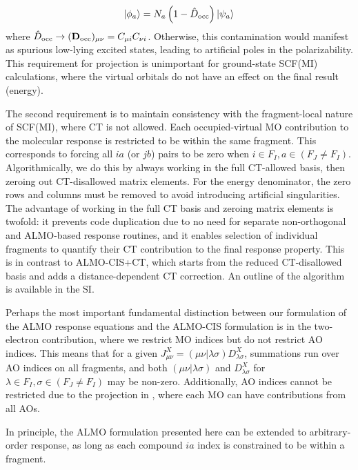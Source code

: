 \documentclass[%
  class = book,%
  crop = false,%
  float = true,%
  multi = true,%
  preview = false,%
]{standalone}
\let\cite\autocite
\begin{document}
\begin{equation}
  \label{eq:projected-virtuals}
  \ket{\phi_{a}} = N_{a} \left( 1 - \hat{D}_{\text{occ}} \right) \ket{\psi_{a}}
\end{equation}
where \(\hat{D}_{\text{occ}} \rightarrow (\mathbf{D}_{\text{occ}})_{\mu\nu} = C_{\mu i} C_{\nu i}\). Otherwise, this contamination would manifest as spurious low-lying excited states, leading to artificial poles in the polarizability. This requirement for projection is unimportant for ground-state SCF(MI) calculations, where the virtual orbitals do not have an effect on the final result (energy).

The second requirement is to maintain consistency with the fragment-local nature of SCF(MI), where CT is not allowed. Each occupied-virtual MO contribution to the molecular response is restricted to be within the same fragment. This corresponds to forcing all \(ia\) (or \(jb\)) pairs to be zero when \(i \in F_{I}, a \in (F_{J} \neq F_{I})\). Algorithmically, we do this by always working in the full CT-allowed basis, then zeroing out CT-disallowed matrix elements. For the energy denominator, the zero rows and columns must be removed to avoid introducing artificial singularities. The advantage of working in the full CT basis and zeroing matrix elements is twofold: it prevents code duplication due to no need for separate non-orthogonal and ALMO-based response routines, and it enables selection of individual fragments to quantify their CT contribution to the final response property. This is in contrast to ALMO-CIS+CT\cite{Ge_2017_44111}, which starts from the reduced CT-disallowed basis and adds a distance-dependent CT correction. An outline of the algorithm is available in the SI.

Perhaps the most important fundamental distinction between our formulation of the ALMO response equations and the ALMO-CIS formulation is in the two-electron contribution, where we restrict MO indices but do not restrict AO indices. This means that for a given \(J_{\mu\nu}^{X} = (\mu\nu|\lambda\sigma)D_{\lambda\sigma}^{X}\), summations run over AO indices on all fragments, and both \((\mu\nu|\lambda\sigma)\) and \(D_{\lambda\sigma}^{X}\) for \(\lambda\in F_{I}, \sigma\in (F_{J} \neq F_{I})\) may be non-zero. Additionally, AO indices cannot be restricted due to the projection in , where each MO can have contributions from all AOs.

In principle, the ALMO formulation presented here can be extended to arbitrary-order response, as long as each compound \(ia\) index is constrained to be within a fragment.
\end{document}
